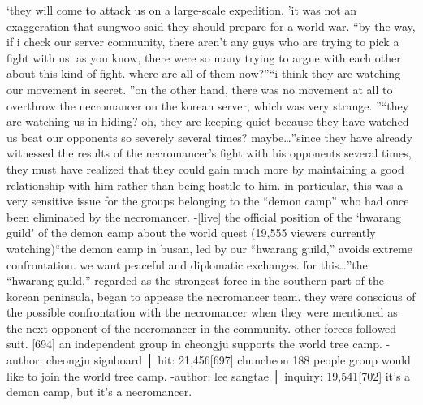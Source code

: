 ‘they will come to attack us on a large-scale expedition.
’it was not an exaggeration that sungwoo said they should prepare for a world war.
“by the way, if i check our server community, there aren’t any guys who are trying to pick a fight with us.
 as you know, there were so many trying to argue with each other about this kind of fight.
 where are all of them now?”“i think they are watching our movement in secret.
”on the other hand, there was no movement at all to overthrow the necromancer on the korean server, which was very strange.
”“they are watching us in hiding? oh, they are keeping quiet because they have watched us beat our opponents so severely several times? maybe…”since they have already witnessed the results of the necromancer’s fight with his opponents several times, they must have realized that they could gain much more by maintaining a good relationship with him rather than being hostile to him.
in particular, this was a very sensitive issue for the groups belonging to the “demon camp” who had once been eliminated by the necromancer.
-[live] the official position of the ‘hwarang guild’ of the demon camp about the world quest (19,555 viewers currently watching)“the demon camp in busan, led by our “hwarang guild,” avoids extreme confrontation.
 we want peaceful and diplomatic exchanges.
 for this…”the “hwarang guild,” regarded as the strongest force in the southern part of the korean peninsula, began to appease the necromancer team.
they were conscious of the possible confrontation with the necromancer when they were mentioned as the next opponent of the necromancer in the community.
other forces followed suit.
[694] an independent group in cheongju supports the world tree camp.
-author: cheongju signboard │ hit: 21,456[697] chuncheon 188 people group would like to join the world tree camp.
-author: lee sangtae │ inquiry: 19,541[702] it’s a demon camp, but it’s a necromancer.

